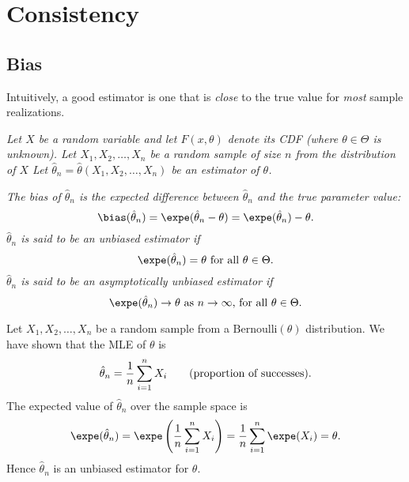 \chapter{Consistency}\label{chap:consistency}
\setcounter{page}{1}
\startcontents[chapters]
\chapcontents

\section{Bias}
Intuitively, a good estimator is one that is \emph{close} to the true value for \emph{most} sample realizations.

\vspace*{1ex}
\bit
\it Let $X$ be a random variable and let $F(x,\theta)$ denote its CDF (where $\theta\in\Theta$ is unknown).
\it
Let $X_1,X_2,\ldots, X_n$ be a random sample of size $n$ from the distribution of $X$
\it
Let $\hat{\theta}_n = \hat{\theta}(X_1,X_2,\ldots,X_n)$ be an estimator of $\theta$.
\eit

\begin{definition}
\ben
\it The \emph{bias} of $\hat{\theta}_n$ is the expected difference between $\hat{\theta}_n$ and the true parameter value:
\[
\bias(\hat{\theta}_n) = \expe(\hat{\theta}_n-\theta) = \expe(\hat{\theta}_n) - \theta.
\]
\it 
$\hat{\theta}_n$ is said to be an \emph{unbiased} estimator if 
\[
\expe(\hat{\theta}_n) = \theta \text{ for all $\theta\in\Theta$.}
\]
\it 
$\hat{\theta}_n$ is said to be an \emph{asymptotically unbiased} estimator if 
\[
\expe(\hat{\theta}_n)\to\theta \text{ as $n\to\infty$, for all $\theta\in\Theta$.} 
\]
\een
\end{definition}

\begin{example}
Let $X_1,X_2,\ldots,X_n$ be a random sample from a $\text{Bernoulli}(\theta)$ distribution. We have shown that the MLE of $\theta$ is
\[
\hat{\theta}_n = \frac{1}{n}\sum_{i=1}^n X_i \text{\qquad(proportion of successes).}
\]
The expected value of $\hat{\theta}_n$ over the sample space is
\[
\expe(\hat{\theta}_n) 
	= \expe\left(\frac{1}{n}\sum_{i=1}^n X_i\right) 
	= \frac{1}{n}\sum_{i=1}^n \expe(X_i)
	= \theta.
\]
Hence $\hat{\theta}_n$ is an unbiased estimator for $\theta$.
\end{example}

